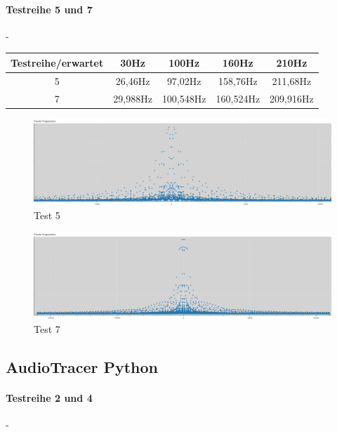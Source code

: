 \newpage

\paragraph{Testreihe 5 und 7}

-
\begin{table}[hbt]
	\centering
	\begin{tabular}{|c | c | c | c | c |}		
		\hline
		Testreihe/erwartet & 30Hz & 100Hz & 160Hz & 210Hz\\
		\hline\hline
		5		&	26,46Hz & 97,02Hz & 158,76Hz & 211,68Hz \\
		7		&	29,988Hz & 100,548Hz & 160,524Hz & 209,916Hz \\
		\hline	
	\end{tabular}	
\end{table}

\begin{figure}[hbt]
	\centering      
	\includegraphics[scale=0.34]{results/test5.png}
	\caption{Test 5}
	\label{fig:test5}
\end{figure}

\begin{figure}[hbt]
	\centering      
	\includegraphics[scale=0.34]{results/test7.png}
	\caption{Test 7}
	\label{fig:test7}
\end{figure}

\newpage
\subsection{AudioTracer Python}

\paragraph{Testreihe 2 und 4}
-

